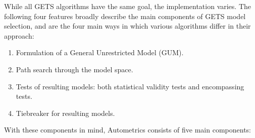 \documentclass[11pt, oneside]{book}   	%
\begin{document}
While all GETS algorithms have the same goal, the implementation varies. The following four features broadly describe the main components of GETS model selection, and are the four main ways in which various algorithms differ in their approach:

\begin{enumerate}
\item Formulation of a General Unrestricted Model (GUM).
\item Path search through the model space.
\item Tests of resulting models: both statistical validity tests and encompassing tests.
\item Tiebreaker for resulting models.

\end{enumerate}

With these components in mind, Autometrics consists of five main components:
\end{document}
